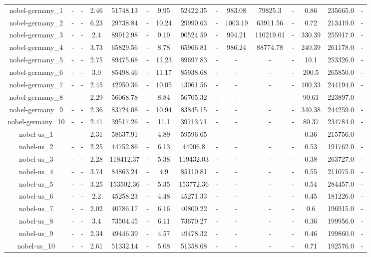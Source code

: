 \documentclass[main.tex]{subfiles}
\begin{document}
\begin{landscape}
\begin{table}[h]
{\begin{tabular}{c|cc|ccc|ccc|ccc|ccc}
	nobel-germany\_1 &- &- &2.46 &51748.13 &- &9.95 &52422.35 &- &983.08 &79825.3 &- &0.86 &235665.0 &-\\
	nobel-germany\_2 &- &- &6.23 &29738.84 &- &10.24 &29990.63 &- &1003.19 &63911.56 &- &0.72 &213419.0 &-\\
	nobel-germany\_3 &- &- &2.4 &89912.98 &- &9.19 &90524.59 &- &994.21 &110219.01 &- &330.39 &255917.0 &-\\
	nobel-germany\_4 &- &- &3.73 &65829.56 &- &8.78 &65966.81 &- &986.24 &88774.78 &- &240.39 &261178.0 &-\\
	nobel-germany\_5 &- &- &2.75 &89475.68 &- &11.23 &89697.83 &- &- &- &- &10.1 &253326.0 &-\\
	nobel-germany\_6 &- &- &3.0 &85498.46 &- &11.17 &85938.68 &- &- &- &- &200.5 &265850.0 &-\\
	nobel-germany\_7 &- &- &2.45 &42950.36 &- &10.05 &43061.56 &- &- &- &- &100.33 &244194.0 &-\\
	nobel-germany\_8 &- &- &2.29 &56068.78 &- &8.84 &56705.32 &- &- &- &- &90.61 &223897.0 &-\\
	nobel-germany\_9 &- &- &2.36 &83724.08 &- &10.94 &83845.15 &- &- &- &- &340.38 &244259.0 &-\\
	nobel-germany\_10 &- &- &2.41 &39517.26 &- &11.1 &39713.71 &- &- &- &- &80.37 &234784.0 &-\\
	nobel-us\_1 &- &- &2.31 &58637.91 &- &4.89 &59596.65 &- &- &- &- &0.36 &215756.0 &-\\
	nobel-us\_2 &- &- &2.25 &44752.86 &- &6.13 &44906.8 &- &- &- &- &0.53 &191762.0 &-\\
	nobel-us\_3 &- &- &2.28 &118412.37 &- &5.38 &119432.03 &- &- &- &- &0.38 &263727.0 &-\\
	nobel-us\_4 &- &- &3.74 &84863.24 &- &4.9 &85110.81 &- &- &- &- &0.55 &211075.0 &-\\
	nobel-us\_5 &- &- &3.25 &153502.36 &- &5.35 &153772.36 &- &- &- &- &0.54 &284457.0 &-\\
	nobel-us\_6 &- &- &2.2 &45258.23 &- &4.48 &45271.33 &- &- &- &- &0.45 &181226.0 &-\\
	nobel-us\_7 &- &- &2.02 &40786.17 &- &6.16 &40800.22 &- &- &- &- &0.6 &196915.0 &-\\
	nobel-us\_8 &- &- &3.4 &73504.45 &- &6.11 &73670.27 &- &- &- &- &0.36 &199956.0 &-\\
	nobel-us\_9 &- &- &2.34 &49446.39 &- &4.57 &49478.32 &- &- &- &- &0.46 &199860.0 &-\\
	nobel-us\_10 &- &- &2.61 &51332.14 &- &5.08 &51358.68 &- &- &- &- &0.71 &192576.0 &-\\

\end{tabular}}
\end{table}
\end{landscape}
\end{document}
